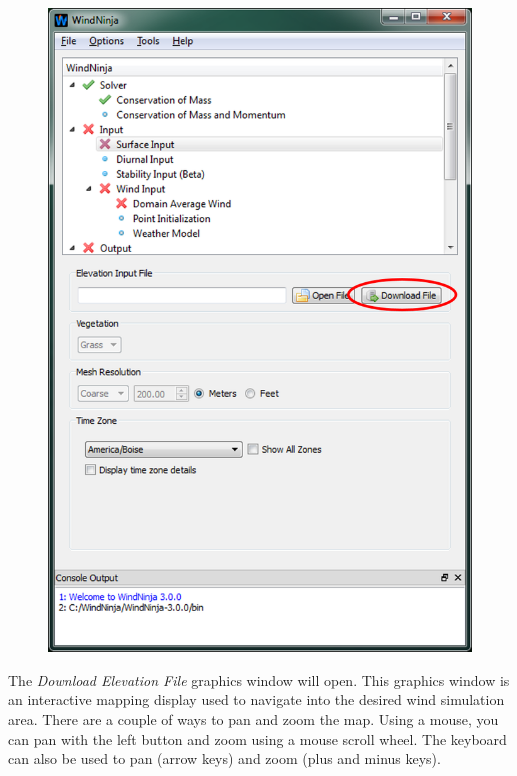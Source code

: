 \documentclass[12pt]{article}
\begin{document}
\begin{figure}[H]
	\centering
	\label{}
	\includegraphics[scale=0.75]{main_window_0}
\end{figure}
\newpage

The \textit{Download Elevation File} graphics window will open. This graphics window is an interactive mapping display used to navigate into the desired wind simulation area. There are a couple of ways to pan and zoom the map.  Using a mouse, you can pan with the left button and zoom using a mouse scroll wheel.  The keyboard can also be used to pan (arrow keys) and zoom (plus and minus keys).
\end{document}
